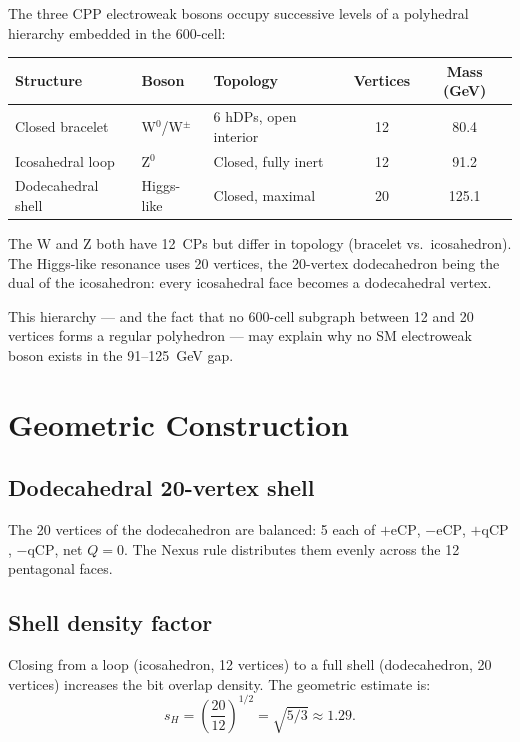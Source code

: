\documentclass[11pt,letterpaper]{article}
\begin{document}
The three CPP electroweak bosons occupy successive levels of a
polyhedral hierarchy embedded in the 600-cell:

\begin{center}
\begin{tabular}{@{}lllcc@{}}
\toprule
Structure & Boson & Topology & Vertices & Mass (GeV) \\
\midrule
Closed bracelet & W$^0$/W$^\pm$ & 6 hDPs, open interior & 12 & 80.4 \\
Icosahedral loop & Z$^0$ & Closed, fully inert & 12 & 91.2 \\
Dodecahedral shell & Higgs-like & Closed, maximal & 20 & 125.1 \\
\bottomrule
\end{tabular}
\end{center}

The W and Z both have 12~CPs but differ in topology (bracelet vs.\
icosahedron).  The Higgs-like resonance uses 20 vertices, the
20-vertex dodecahedron being the dual of the icosahedron: every
icosahedral face becomes a dodecahedral vertex.

This hierarchy --- and the fact that no 600-cell subgraph between
12 and 20 vertices forms a regular polyhedron --- may explain why
no SM electroweak boson exists in the 91--125~GeV gap.

\section{Geometric Construction}

\subsection{Dodecahedral 20-vertex shell}

The 20 vertices of the dodecahedron are balanced: 5 each of
$+\text{eCP}$, $-\text{eCP}$, $+\text{qCP}$, $-\text{qCP}$,
net $Q=0$.  The Nexus rule distributes them evenly across the 12
pentagonal faces.

\subsection{Shell density factor}

Closing from a loop (icosahedron, 12 vertices) to a full shell
(dodecahedron, 20 vertices) increases the bit overlap density.
The geometric estimate is:
\begin{equation}
s_H
= \left(\frac{20}{12}\right)^{1/2}
= \sqrt{5/3}
\approx 1.29.
\label{eq:shelldens_ideal}
\end{equation}
\end{document}
